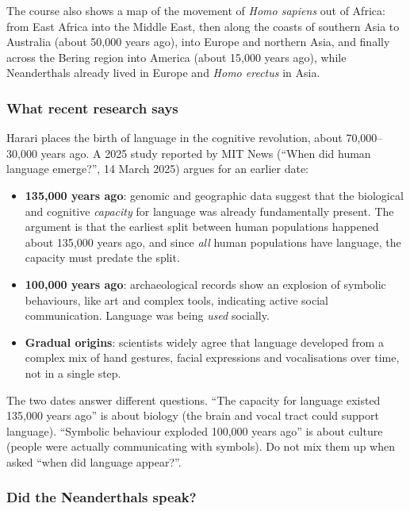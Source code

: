 The course also shows a map of the movement of \emph{Homo sapiens} out of Africa: from
East Africa into the Middle East, then along the coasts of southern Asia to Australia
(about 50{,}000 years ago), into Europe and northern Asia, and finally across the Bering
region into America (about 15{,}000 years ago), while Neanderthals already lived in
Europe and \emph{Homo erectus} in Asia.

\subsubsection{What recent research says}

Harari places the birth of language in the cognitive revolution, about
70{,}000--30{,}000 years ago. A 2025 study reported by MIT News (``When did human language
emerge?'', 14 March 2025) argues for an earlier date:

\begin{itemize}[nosep]
  \item \textbf{135{,}000 years ago}: genomic and geographic data suggest that the
        biological and cognitive \emph{capacity} for language was already fundamentally
        present. The argument is that the earliest split between human populations
        happened about 135{,}000 years ago, and since \emph{all} human populations have
        language, the capacity must predate the split.
  \item \textbf{100{,}000 years ago}: archaeological records show an explosion of
        symbolic behaviours, like art and complex tools, indicating active social
        communication. Language was being \emph{used} socially.
  \item \textbf{Gradual origins}: scientists widely agree that language developed from a
        complex mix of hand gestures, facial expressions and vocalisations over time,
        not in a single step.
\end{itemize}

\begin{nbwarning}
The two dates answer different questions. ``The capacity for language existed
135{,}000 years ago'' is about biology (the brain and vocal tract could support
language). ``Symbolic behaviour exploded 100{,}000 years ago'' is about culture (people
were actually communicating with symbols). Do not mix them up when asked ``when did
language appear?''.
\end{nbwarning}

\subsubsection{Did the Neanderthals speak?}

